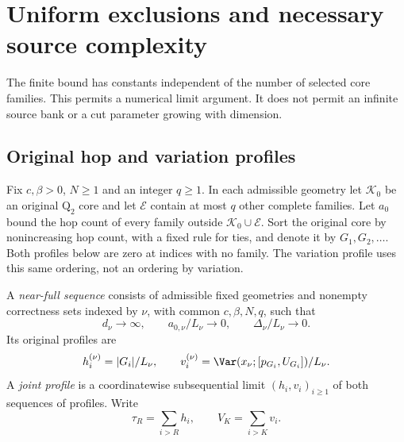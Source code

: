 \section{Uniform exclusions and necessary source complexity}\label{sec:uniform}

The finite bound has constants independent of the number of selected
core families. This permits a numerical limit argument. It does not
permit an infinite source bank or a cut parameter growing with dimension.

\subsection{Original hop and variation profiles}

Fix $c,\beta>0$, $N\ge1$ and an integer $q\ge1$. In each admissible
geometry let $\mathcal K_0$ be an original $\mathrm Q_2$ core and let
$\mathcal E$ contain at most $q$ other complete families. Let $a_0$ bound
the hop count of every family outside $\mathcal K_0\cup\mathcal E$.
Sort the original core by nonincreasing hop count, with a fixed rule
for ties, and denote it by $G_1,G_2,\ldots$. Both profiles below are
zero at indices with no family. The variation profile uses this same ordering, not an ordering
by variation.

\begin{definition}\label{def:joint-profile}
A \emph{near-full sequence} consists of admissible fixed geometries and
nonempty correctness sets indexed by $\nu$, with common $c,\beta,N,q$,
such that
\begin{equation}\label{eq:near-full}
 d_\nu\longrightarrow\infty,\qquad
 a_{0,\nu}/L_\nu\longrightarrow0,\qquad
 \Delta_\nu/L_\nu\longrightarrow0.
\end{equation}
Its original profiles are
\[
 h_i^{(\nu)}=|G_i|/L_\nu,\qquad
 v_i^{(\nu)}=\Var(x_\nu;[p_{G_i},U_{G_i}])/L_\nu.
\]
A \emph{joint profile} is a coordinatewise subsequential limit
$(h_i,v_i)_{i\ge1}$ of both sequences of profiles. Write
\[
 \tau_R=\sum_{i>R}h_i,\qquad V_K=\sum_{i>K}v_i.
\]
\end{definition}


